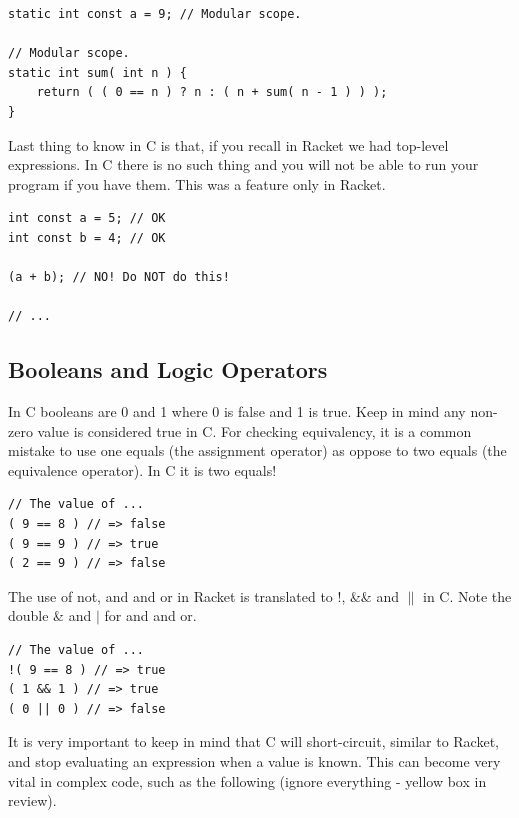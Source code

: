 \documentclass[12pt,extarticle]{article}
\begin{document}
\begin{lstlisting}
static int const a = 9; // Modular scope.

// Modular scope.
static int sum( int n ) {
	return ( ( 0 == n ) ? n : ( n + sum( n - 1 ) ) );
}
\end{lstlisting}

Last thing to know in C is that, if you recall in Racket we had top-level expressions. In C there is no such thing and you will not be able to run your program if you have them. This was a feature only in Racket.\\

\lstset {
	language=c
}
\begin{lstlisting}
int const a = 5; // OK
int const b = 4; // OK

(a + b); // NO! Do NOT do this!

// ...
\end{lstlisting}

\subsection{Booleans and Logic Operators}

In C booleans are 0 and 1 where 0 is false and 1 is true. Keep in mind any non-zero value is considered true in C. For checking equivalency, it is a common mistake to use one equals (the assignment operator) as oppose to two equals (the equivalence operator). In C it is two equals!\\

\lstset {
	language=c
}
\begin{lstlisting}
// The value of ...
( 9 == 8 ) // => false
( 9 == 9 ) // => true
( 2 == 9 ) // => false
\end{lstlisting}

The use of not, and and or in Racket is translated to !, \&\& and $\parallel$ in C. Note the double \& and $\mid$ for and and or.\\

\lstset {
	language=c
}
\begin{lstlisting}
// The value of ...
!( 9 == 8 ) // => true
( 1 && 1 ) // => true
( 0 || 0 ) // => false
\end{lstlisting}

It is very important to keep in mind that C will short-circuit, similar to Racket, and stop evaluating an expression when a value is known. This can become very vital in complex code, such as the following (ignore everything - yellow box in review).\\
\end{document}
